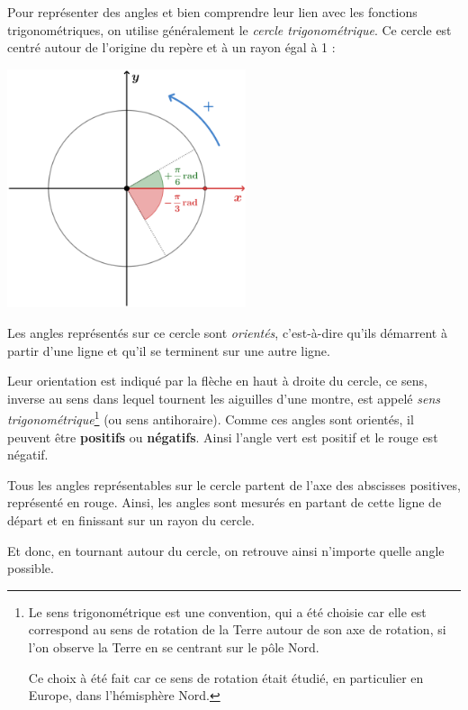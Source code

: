 \documentclass[a4paper]{article}
\begin{document}
			Pour représenter des angles et 
			bien comprendre leur lien avec 
			les fonctions trigonométriques, 
			on utilise généralement le \emph{cercle trigonométrique}. 
			Ce cercle est centré autour de l'origine 
			du repère et à un rayon égal à 1 :

			\begin{multicols}{2}

				\begin{center}
					\includegraphics[width=7cm]{Image/Cercle Trigo/Cercle_trigo_sens_trigo.PNG}
				\end{center}

				Les angles représentés sur ce cercle sont \emph{orientés},
				c'est-à-dire qu'ils démarrent à partir d'une ligne et qu'il se terminent sur une autre ligne.
				
				Leur orientation est indiqué par la flèche en haut à droite du cercle, 
				ce sens, inverse au sens dans lequel tournent les aiguilles d'une montre, 
				est appelé \emph{sens trigonométrique}\footnote{
					Le sens trigonométrique est une convention,
					qui a été choisie car elle est correspond au sens de rotation
					de la Terre autour de son axe de rotation,
					si l'on observe la Terre en se centrant sur le pôle Nord.

					Ce choix à été fait car ce sens de rotation était étudié, 
					en particulier en Europe, dans l'hémisphère Nord.
				} (ou sens antihoraire).
				Comme ces angles sont orientés, il peuvent être \textbf{positifs} ou \textbf{négatifs}.
				Ainsi l'angle vert est positif et le rouge est négatif. 

				Tous les angles représentables sur le cercle partent de l'axe des abscisses positives,
				représenté en rouge.
				Ainsi, les angles sont mesurés en partant de cette ligne de départ
				et en finissant sur un rayon du cercle.

				Et donc, en tournant autour du cercle, on retrouve ainsi n'importe quelle angle possible. 

			\end{multicols}
\end{document}
